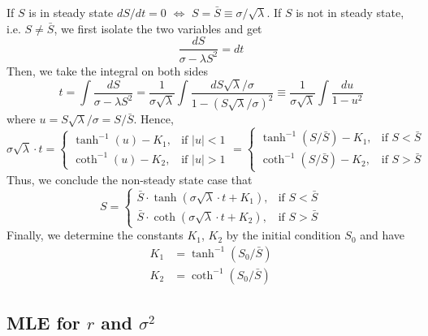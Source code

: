 \documentclass[mnsc]{informs3}
\begin{document}
\begin{APPENDICES}
If $S$ is in steady state $dS/dt = 0$ $\Leftrightarrow$ $S = \bar{S} \equiv \sigma/\sqrt{\lambda}$. 
If $S$ is not in steady state, i.e. $S\not=\bar{S}$, we first isolate the two variables and get 
\begin{equation*}
	\frac{dS}{\sigma-\lambda S^2} = dt
\end{equation*}
Then, we take the integral on both sides
\begin{equation*}
    t = \int \frac{dS}{\sigma-\lambda S^2} = \frac{1}{\sigma\sqrt{\lambda}} \int \frac{dS\sqrt{\lambda}/\sigma}{1 - (S\sqrt{\lambda}/\sigma)^2} \equiv \frac{1}{\sigma\sqrt{\lambda}}\int \frac{du}{1-u^2} 
\end{equation*}
where $u = S\sqrt{\lambda}/\sigma = S/\bar{S}$. Hence, 
\begin{equation*}
    \sigma\sqrt{\lambda}\cdot t = \begin{cases}
        \tanh^{-1}(u)-K_1, & \text{if } |u|<1\\
        \coth^{-1}(u)-K_2, & \text{if } |u|>1
    \end{cases} = \begin{cases}
        \tanh^{-1}(S/\bar{S})-K_1, & \text{if } S<\bar{S}\\
        \coth^{-1}(S/\bar{S})-K_2, & \text{if } S>\bar{S} 
\end{cases}
\end{equation*}
Thus, we conclude the non-steady state case that 
\begin{equation*}
	S = \begin{cases}
		\bar{S}\cdot\tanh(\sigma\sqrt{\lambda}\cdot t + K_1), & \text{if } S<\bar{S}\\
		\bar{S}\cdot\coth(\sigma\sqrt{\lambda}\cdot t + K_2), & \text{if } S>\bar{S} 
	\end{cases}
\end{equation*}
Finally, we determine the constants $K_1$, $K_2$ by the initial condition $S_0$ and have 
\begin{align*}
	K_1 &= \tanh^{-1}(S_0/\bar{S})\\
	K_2 &= \coth^{-1}(S_0/\bar{S})
\end{align*}


\subsection{MLE for $r$ and $\sigma^2$}


\end{APPENDICES}
\end{document}

